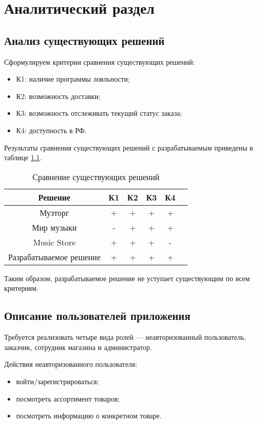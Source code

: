 \chapter{Аналитический раздел}

\section{Анализ существующих решений}

Сформулируем критерии сравнения существующих решений:
\begin{itemize}
	\item К1: наличие программы лояльности;
	\item К2: возможность доставки;
	\item К3: возможность отслеживать текущий статус заказа;
	\item К4: доступность в РФ.
\end{itemize}

Результаты сравнения существующих решений с разрабатываемым приведены в таблице \ref{tabular:cmp}.
\begin{table}[h]
	\begin{center}
		\caption{\label{tabular:cmp} Сравнение существующих решений}
		\begin{tabular}{|c|c|c|c|c|c|}
			\hline
			Решение & К1 & К2 & К3 & К4\\
			\hline
			Музторг & + & + & + & + \\
			\hline
			Мир музыки & - & + & + & + \\
			\hline
			Music Store & + & + & + & - \\
			\hline
			Разрабатываемое решение & + & + & + & + \\
			\hline
		\end{tabular}
	\end{center}
\end{table}

Таким образом, разрабатываемое решение не уступает существующим по всем критериям.

\section{Описание пользователей приложения}
Требуется реализовать четыре вида ролей --- неавторизованный пользователь, заказчик, сотрудник магазина
и администратор.

Действия неавторизованного пользователя:
\begin{itemize}
	\item войти/зарегистрироваться;
	\item посмотреть ассортимент товаров;
	\item посмотреть информацию о конкретном товаре.
\end{itemize}

